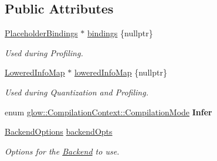 \subsection*{Public Attributes}
\begin{DoxyCompactItemize}
\item 
\mbox{\label{structglow_1_1_compilation_context_ac83a8c20aff85167069c3e188d4bf9b9}} 
\hyperlink{classglow_1_1_placeholder_bindings}{Placeholder\+Bindings} $\ast$ \hyperlink{structglow_1_1_compilation_context_ac83a8c20aff85167069c3e188d4bf9b9}{bindings} \{nullptr\}
\begin{DoxyCompactList}\small\item\em Used during Profiling. \end{DoxyCompactList}\item 
\mbox{\label{structglow_1_1_compilation_context_adce436b4b85ab08a7fa61538c571aeeb}} 
\hyperlink{namespaceglow_a419aca63ca48becda137d774dd06493c}{Lowered\+Info\+Map} $\ast$ \hyperlink{structglow_1_1_compilation_context_adce436b4b85ab08a7fa61538c571aeeb}{lowered\+Info\+Map} \{nullptr\}
\begin{DoxyCompactList}\small\item\em Used during Quantization and Profiling. \end{DoxyCompactList}\item 
\mbox{\label{structglow_1_1_compilation_context_a8aab22abfcd7f6fa96cd0cef0120d430}} 
enum \hyperlink{structglow_1_1_compilation_context_a92efb87746c0edf7756b84fdcd87014a}{glow\+::\+Compilation\+Context\+::\+Compilation\+Mode} {\bfseries Infer}
\item 
\mbox{\label{structglow_1_1_compilation_context_a342c91bb994ad5f0a8f4e2b58c9851aa}} 
\hyperlink{structglow_1_1_backend_options}{Backend\+Options} \hyperlink{structglow_1_1_compilation_context_a342c91bb994ad5f0a8f4e2b58c9851aa}{backend\+Opts}
\begin{DoxyCompactList}\small\item\em Options for the \hyperlink{classglow_1_1_backend}{Backend} to use. \end{DoxyCompactList}\item 
\mbox{\label{structglow_1_1_compilation_context_af9c1dd72e16ad800aefb856201324236}} 

\end{DoxyCompactItemize}
